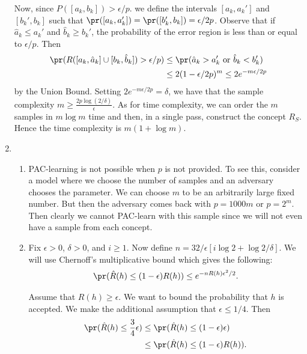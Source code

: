 \begin{enumerate}
    Now, since $P([a_k,b_k]) > \epsilon/p$.
    we define the intervals $[a_k, a_k']$ and $[b_k', b_k]$
    such that $\pr([a_k, a_k'])=\pr([b_k', b_k])=\epsilon/2p$.
    Observe that if $\hat{a}_k \leq a_k'$ and $\hat{b}_k \geq b_k'$,
    the probability of the error region is less than or equal
    to $\epsilon/p$.
    Then
    \begin{align}
        \pr(R([a_k, \hat{a}_k] \cup [b_k, \hat{b}_k])>\epsilon/p)
        & \leq \pr(\hat{a}_k>a_k' \textrm{ or } \hat{b}_k < b_k')
        \nonumber \\
        & \leq 2(1-\epsilon/2p)^m \leq 2e^{-m\epsilon/2p}
        \nonumber
    \end{align}
    by the Union Bound.
    Setting $2e^{-m\epsilon/2p} = \delta$,
    we have that the sample complexity
    $m \geq \frac{2p \log (2 / \delta )}{\epsilon}$.
    As for time complexity, we can order the $m$ samples
    in $m \log m$ time and then, in a single pass,
    construct the concept $R_S$.
    Hence the time complexity is $m (1+\log m)$.

    \item
    \begin{enumerate}
        \item
        PAC-learning is not possible when $p$ is not provided.
        To see this, consider a model where we choose
        the number of samples and an adversary chooses the parameter.
        We can choose $m$ to be an arbitrarily large
        fixed number.
        But then the adversary comes back with $p=1000m$ or $p=2^m$.
        Then clearly we cannot PAC-learn with this sample since
        we will not even have a sample from each concept.

        \item Fix $\epsilon > 0$, $\delta > 0$, and $i \geq 1$.
        Now define $n=32/\epsilon [i \log 2 + \log 2/\delta]$.
        We will use Chernoff's multiplicative bound
        which gives the following:
        \begin{align}
            \pr(\hat{R}(h)\leq(1-\epsilon)R(h)) \leq
            e^{-nR(h)\epsilon^2/2}.
            \nonumber
        \end{align}

        Assume that $R(h) \geq \epsilon$.
        We want to bound the probability that
        $h$ is accepted.
        We make the additional assumption
        that $\epsilon \leq 1/4$.
        Then
        \begin{align}
            \pr(\hat{R}(h)\leq \frac{3}{4}\epsilon)
            &\leq \pr(\hat{R}(h)\leq (1-\epsilon)\epsilon)
            \nonumber \\
            &\leq \pr(\hat{R}(h)\leq (1-\epsilon)R(h)).
            \nonumber
        \end{align}


\end{enumerate}
\end{enumerate}
